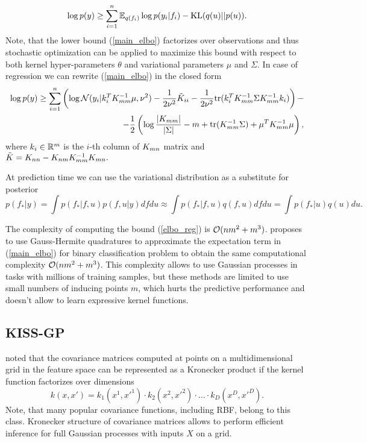 \begin{equation}
\label{main_elbo}
  \log p(y) \ge \sum_{i=1}^n \mathbb{E}_{q(f_i)} \log p(y_i | f_i) - \mbox{KL}(q(u) || p(u)).
\end{equation}
  Note, that the lower bound (\ref{main_elbo}) factorizes over observations and
  thus stochastic optimization can be applied to maximize this bound with respect
  to both kernel hyper-parameters $\theta$ and variational parameters $\mu$ and
  $\Sigma$. In case of regression we can rewrite (\ref{main_elbo}) in the closed
  form
  \begin{equation}
    \label{elbo_reg}
    \begin{split}
      \log p(y) \ge
      \sum_{i=1}^n \left ( \log \mathcal{N} (y_i | k_{i}^T K_{mm}^{-1} \mu, \nu^2) -
        \frac 1 {2\nu^2} \tilde K_{ii} -
        \frac 1 {2\nu^2} \mbox{tr} (k_{i}^T K_{mm}^{-1} \Sigma K_{mm}^{-1} k_{i})
      \right )-
      \\
      - \frac 1 2 \left(
        \log \frac {|K_{mm}|} {|\Sigma|} - m + \mbox{tr}(K_{mm}^{-1} \Sigma) +
        \mu^T K_{mm}^{-1} \mu
      \right),
    \end{split}
  \end{equation}
  where $k_{i} \in \mathbb{R}^m$ is the $i$-th column of $K_{mn}$ matrix and $\tilde{K} = K_{nn} - K_{nm} K_{mm}^{-1} K_{mn}.$
  
  At prediction time we can use the variational distribution as a substitute for
  posterior
  \[
    p(f_* | y) = \int p(f_*| f, u) p(f, u |y) d f d u \approx
    \int p(f_* | f, u) q(f, u) d f d u = \int p(f_* | u) q(u) du.
  \]

  The complexity of computing the bound (\ref{elbo_reg}) is $\mathcal{O}(n m^2 + m^3)$.
  \citet{hensman2015} proposes to use Gauss-Hermite quadratures to approximate the
  expectation term in (\ref{main_elbo}) for binary classification problem to
  obtain the same computational complexity $\mathcal{O}(nm^2 + m^3)$. This complexity
  allows to use Gaussian processes in tasks with millions of training samples,
  but these methods are limited to use small numbers of inducing points $m$,
  which hurts the predictive performance and doesn't allow to learn expressive
  kernel functions.

\subsection{KISS-GP}
\label{kiss_gp}

  \citet{saatci2012} noted that the covariance matrices computed at points on a
  multidimensional grid in the feature space can be represented as a Kronecker
  product if the kernel function factorizes over dimensions
  \begin{equation}
  \label{prod_kernel}
    k(x, x') = k_1(x^1, x'^1)\cdot k_2(x^2, x'^2)\cdot \ldots\cdot k_D(x^D, x'^D).
  \end{equation}
  Note, that many popular covariance functions, including RBF, belong to this class.
  Kronecker structure of covariance matrices allows to perform efficient inference
  for full Gaussian processes with inputs $X$ on a grid.

